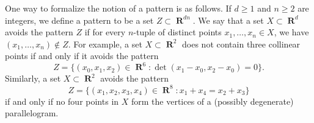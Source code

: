 \documentclass[dvipsnames,letterpaper,12pt]{article}
\numberwithin{equation}{section}
\theoremstyle{plain}
\theoremstyle{remark}
\DeclareMathOperator{\RR}{\mathbf{R}}
\begin{document}
One way to formalize the notion of a pattern is as follows. If $d \geq 1$ and $n \geq 2$ are integers, we define a pattern to be a set $Z \subset \RR^{dn}$. We say that a set $X \subset \RR^d$ avoids the pattern $Z$ if for every $n$-tuple of distinct points $x_1, \ldots, x_n\in X$, we have $(x_1,\ldots,x_n) \not \in Z$.
%
%
%
For example, a set $X \subset \RR^2$ does not contain three collinear points if and only if it avoids the pattern
%
\[ Z = \{ (x_0,x_1,x_2) \in \RR^6 : \det(x_1 - x_0, x_2 - x_0) = 0 \}. \]
%
Similarly, a set $X \subset \RR^2$ avoids the pattern
%
\[ Z = \{ (x_1, x_2,x_3,x_4) \in \RR^8 : x_1 + x_4 = x_2 + x_3 \} \]
%
if and only if no four points in $X$ form the vertices of a (possibly degenerate) parallelogram.
\end{document}
